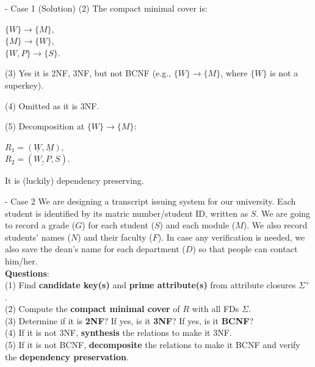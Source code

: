 \begin{frame}[fragile]{ - Case 1 (Solution)}
	(2) The compact minimal cover is:\\\vspace{5pt}
	
	$\{W\} \rightarrow \{M\},$\\
	$\{M\}  \rightarrow \{W\},$\\
	$\{W, P\} \rightarrow \{S\}.$\\\vspace{5pt}
	
	(3)  Yes it is 2NF, 3NF, but not BCNF (e.g., $\{W\} \rightarrow \{M\}$, where $\{W\}$ is not a superkey).\\\vspace{5pt}
	
	(4) Omitted as it is 3NF. \\\vspace{5pt}
	
	(5) Decomposition at $\{W\} \rightarrow \{M\}$:\\\vspace{5pt}
	
	$R_1 = (\underline{W}, \underline{M}),$\\
	$R_2 = (\underline{W,P}, S).$\\\vspace{5pt}
	
	It is (luckily) dependency preserving.
	
\end{frame}

\begin{frame}[fragile]{ - Case 2}
	We are designing a transcript issuing system for our university. 
	Each student is identified by its matric number/student ID, written as $S$.
	We are going to record a grade ($G$) for each student ($S$) and each module ($M$).
	We also record students' names ($N$) and their faculty ($F$). In case any verification is needed, we also save the dean's name for each department ($D$) so that people can contact him/her.\\\vspace{10pt}
	\textbf{Questions}:\\
	(1) Find \textbf{candidate key(s)} and \textbf{prime attribute(s)} from attribute closures $\Sigma^{+}$.\\
	(2) Compute the \textbf{compact minimal cover} of $R$ with all FDs $\Sigma$.\\
	(3) Determine if it is \textbf{2NF}? If yes, is it \textbf{3NF}? If yes, is it \textbf{BCNF}?\\
	(4) If it is not 3NF, \textbf{synthesis} the relations to make it 3NF.\\
	(5) If it is not BCNF, \textbf{decomposite} the relations to make it BCNF and verify the \textbf{dependency preservation}. 
\end{frame}

